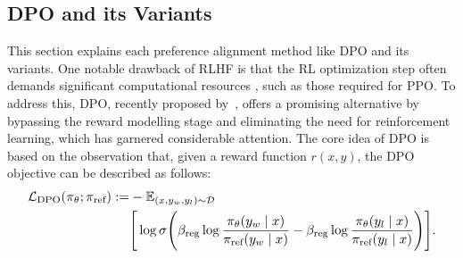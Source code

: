 \subsection{DPO and its Variants}
This section explains each preference alignment method like DPO and its variants. One notable drawback of RLHF is that the RL optimization step often demands significant computational resources \citep{winata2024preference}, such as those required for PPO. To address this, DPO, recently proposed by~\citep{rafailov2024direct}, offers a promising alternative by bypassing the reward modelling stage and eliminating the need for reinforcement learning, which has garnered considerable attention. The core idea of DPO is based on the observation that, given a reward function $r(x, y)$, 
the DPO objective can be described as follows:
\begin{equation}
\resizebox{.95\linewidth}{!}{$
\begin{aligned}
\mathcal{L}_{\text{DPO}}(\pi_\theta; \pi_{\text{ref}}) := & - \mathbb{E}_{(x, y_w, y_l) \sim \mathcal{D}} \nonumber \\
& \Bigg[\log \sigma \Bigg( 
\beta_{\text{reg}} \log \frac{\pi_\theta(y_w \mid x)}{\pi_{\text{ref}}(y_w \mid x)} - \beta_{\text{reg}} \log \frac{\pi_\theta(y_l \mid x)}{\pi_{\text{ref}}(y_l \mid x)}
\Bigg)
\Bigg]. \nonumber
\end{aligned}$}
\end{equation}

